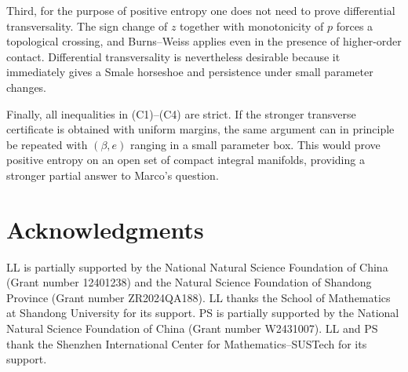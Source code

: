 \documentclass[11pt]{article}
\begin{document}
Third, for the purpose of positive entropy one does not need to prove
differential transversality.  The sign change of $z$ together with
monotonicity of $p$ forces a topological crossing, and Burns--Weiss applies
even in the presence of higher-order contact.  Differential transversality
is nevertheless desirable because it immediately gives a Smale horseshoe
and persistence under small parameter changes.

Finally, all inequalities in (C1)--(C4) are strict.  If the stronger
transverse certificate is obtained with uniform margins, the same argument
can in principle be repeated with $(\beta,e)$ ranging in a small parameter
box.  This would prove positive entropy on an open set of compact integral
manifolds, providing a stronger partial answer to Marco's question.

\section*{Acknowledgments}

LL is partially supported by the National Natural Science Foundation of
China (Grant number 12401238) and the Natural Science Foundation of Shandong
Province (Grant number ZR2024QA188).  LL thanks the School of Mathematics at
Shandong University for its support.  PS is partially supported by the
National Natural Science Foundation of China (Grant number W2431007).
LL and PS thank the Shenzhen International Center for Mathematics--SUSTech
for its support.
\end{document}
